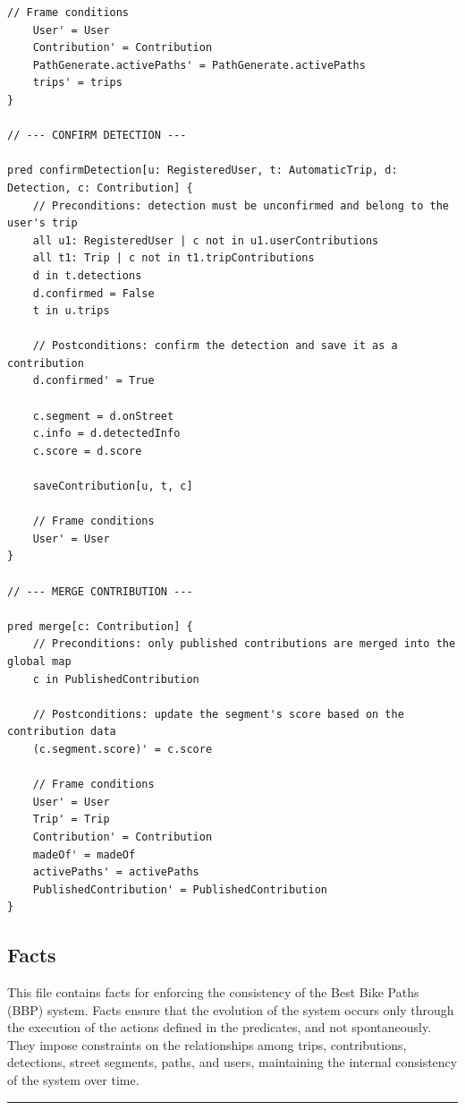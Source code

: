 \begin{lstlisting}[language=alloy, caption={Alloy Predicates for BBP}, label={lst:predicates}]
    // Frame conditions
    User' = User
    Contribution' = Contribution
    PathGenerate.activePaths' = PathGenerate.activePaths
    trips' = trips
}

// --- CONFIRM DETECTION ---

pred confirmDetection[u: RegisteredUser, t: AutomaticTrip, d: Detection, c: Contribution] {
    // Preconditions: detection must be unconfirmed and belong to the user's trip
    all u1: RegisteredUser | c not in u1.userContributions
    all t1: Trip | c not in t1.tripContributions
    d in t.detections
    d.confirmed = False
    t in u.trips

    // Postconditions: confirm the detection and save it as a contribution
    d.confirmed' = True

    c.segment = d.onStreet
    c.info = d.detectedInfo
    c.score = d.score

    saveContribution[u, t, c]

    // Frame conditions
    User' = User
}

// --- MERGE CONTRIBUTION ---

pred merge[c: Contribution] {
    // Preconditions: only published contributions are merged into the global map
    c in PublishedContribution

    // Postconditions: update the segment's score based on the contribution data
    (c.segment.score)' = c.score

    // Frame conditions
    User' = User
    Trip' = Trip
    Contribution' = Contribution
    madeOf' = madeOf
    activePaths' = activePaths
    PublishedContribution' = PublishedContribution
}
\end{lstlisting}

\subsection{Facts}

This file contains facts for enforcing the consistency of the Best Bike Paths (BBP) system. Facts ensure that the evolution of the system occurs only through the execution of the actions defined in the predicates, and not spontaneously. They impose constraints on the relationships among trips, contributions, detections, street segments, paths, and users, maintaining the internal consistency of the system over time.

\noindent\rule{\linewidth}{0.4pt} %

